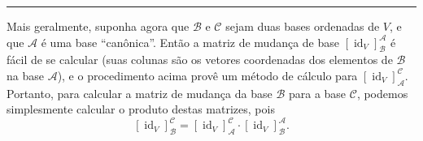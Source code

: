 \hrule

Mais geralmente, suponha agora que $\mathcal{B}$ e $\mathcal{C}$ sejam duas bases ordenadas de $V$, e que $\mathcal{A}$ é uma base ``canônica''. Então a matriz de mudança de base $[\operatorname{id}_V]_{\mathcal{B}}^{\mathcal{A}}$ é fácil de se calcular (suas colunas são os vetores coordenadas dos elementos de $\mathcal{B}$ na base $\mathcal{A}$), e o procedimento acima provê um método de cálculo para $[\operatorname{id}_V]_{\mathcal{A}}^\mathcal{C}$. Portanto, para calcular a matriz de mudança da base $\mathcal{B}$ para a base $\mathcal{C}$, podemos simplesmente calcular o produto destas matrizes, pois
\[\left[\operatorname{id}_V\right]_{\mathcal{B}}^{\mathcal{C}}=\left[\operatorname{id}_V\right]_{\mathcal{A}}^{\mathcal{C}}\cdot\left[\operatorname{id}_V\right]_{\mathcal{B}}^{\mathcal{A}}.\]